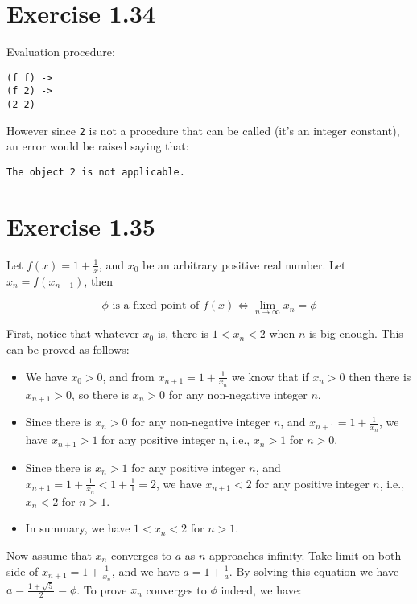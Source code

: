 \documentclass[../main.tex]{subfiles}
\begin{document}
\section{Exercise 1.34}

Evaluation procedure:

\begin{lstlisting}
(f f) ->
(f 2) ->
(2 2)
\end{lstlisting}

However since \lstinline{2} is not a
 procedure that can be called (it's an
 integer constant), an error would be
 raised saying that:

\begin{lstlisting}
The object 2 is not applicable.
\end{lstlisting}

\section{Exercise 1.35}

Let $f(x)=1+\frac{1}{x}$, and $x_0$ be an arbitrary
 positive real number. Let $x_n=f(x_{n-1})$, then

$$
\phi\text{ is a fixed point of }f(x)\iff\lim_{n\to\infty}x_n=\phi
$$

First, notice that whatever $x_0$ is, there is
 $1<x_n<2$ when $n$ is big enough. This can be
 proved as follows:

\begin{itemize}
\item We have $x_0 > 0$, and from $x_{n+1}=1+\frac{1}{x_n}$ we
 know that if $x_n > 0$ then there is $x_{n+1} > 0$, so there is
 $x_n > 0$ for any non-negative integer $n$.
\item Since there is $x_n > 0$ for any non-negative integer $n$,
 and $x_{n+1}=1+\frac{1}{x_n}$, we have $x_{n+1} > 1$ for any
 positive integer n, i.e., $x_n > 1$ for $n > 0$.
\item Since there is $x_n > 1$ for any positive integer $n$,
 and $x_{n+1}=1+\frac{1}{x_n} < 1+\frac{1}{1} = 2$, we have
 $x_{n+1} < 2$ for any positive integer $n$, i.e., $x_n < 2$ for
 $n > 1$.
\item In summary, we have $1 < x_n < 2$ for $n > 1$.
\end{itemize}

Now assume that $x_n$ converges to $a$ as $n$ approaches infinity.
 Take limit on both side of $x_{n+1}=1+\frac{1}{x_n}$, and we have
 $a=1+\frac{1}{a}$. By solving this equation we have
 $a=\frac{1+\sqrt{5}}{2}=\phi$. To prove $x_n$ converges to $\phi$ indeed,
 we have:
\end{document}
